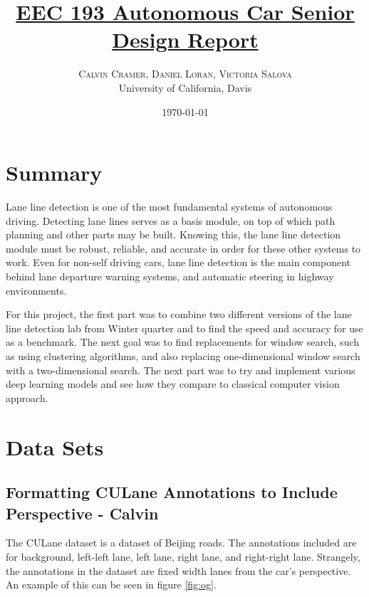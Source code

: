 \documentclass[twoside,twocolumn]{article}
\title{\href{https://github.com/vsalova/lane_lines}{EEC 193 Autonomous Car Senior Design Report}} %
\author{%
\textsc{Calvin Cramer, Daniel Loran, Victoria Salova} \\ %
\normalsize University of California, Davis \\ %
}
\date{\today} %
\begin{document}
\maketitle


\section{Summary}

\par Lane line detection is one of the most fundamental systems of autonomous driving. Detecting lane lines serves as a basis module, on top of which path planning and other parts may be built. Knowing this, the lane line detection module must be robust, reliable, and accurate in order for these other systems to work. Even for non-self driving cars, lane line detection is the main component behind lane departure warning systems, and automatic steering in highway environments.
\par For this project, the first part was to combine two different versions of the lane line detection lab from Winter quarter and to find the speed and accuracy for use as a benchmark. The next goal was to find replacements for window search, such as using clustering algorithms, and also replacing one-dimensional window search with a two-dimensional search. The next part was to try and implement various deep learning models and see how they compare to classical computer vision approach.


\section{Data Sets}
\subsection{Formatting CULane Annotations to Include Perspective - Calvin}
\par The CULane dataset is a dataset of Beijing roads. The annotations included are for background, left-left lane, left lane, right lane, and right-right lane. Strangely, the annotations in the dataset are fixed width lanes from the car's perspective. An example of this can be seen in figure \ref{fig:og}.
\end{document}
